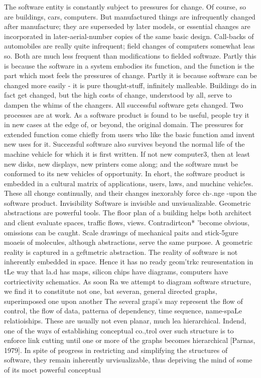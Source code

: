 \documentclass[12pt]{article}
\begin{document}
The software entity is constantly subject to pressures for change. Of course, so
are buildings, cars, computers. But manufactured things are infrequently changed after
manufacture; they are superseded by later models, or essential changes are incorporated
in later-aerial-number copies of the same basic design. Call-backs of automobiles are really
quite infrequent; field changes of computers somewhat leas so. Both are much less frequent
than modifications to fielded softwaze.
Partly this is because the software in a system embodies its function, and the function
is the part which most feels the pressures of change. Partly it is because software can be
changed more easily - it is pure thought-stuff, infinitely malleable. Buildings do in fact
get changed, but the high costs of change, understood by all, serve to dampen the whims
of the changers.
All successful software gets changed. Two processes are at work. As a software product
is found to be useful, people try it in new cases at the edge of, or beyond, the original
domain. The pressures for extended function come chiefly from users who like the basic
function amd invent new uses for it.
Succezsful software also survives beyond the normal life of the machine vehicle for
which it is first written. If not new computer3, then at least new disks, new displays, new
printers come along; and the software must be conformed to its new vehicles of opportunity.
In ehort, the software product is embedded in a cultural matrix of applications, users,
laws, and muchinc vehic!es. These all chonge continually, and their changes inexorably
force ch-.nge -upon the software product.
Invisibility
Software is invisible and unvisualizable. Geometric abstractions are powerful tools.
The floor plan of a building helps both architect and client evaluate spaces, traffic flows,
views. Contradirtcon* 'become obvious, omissions can be caught. Scale drawings of
mechanical paits and stick-5gure moaeis of molecules, although abstractions, serve the
same purpose. A geometric reality is captured in a geftmetric abstraction.
The reality of software is not inherently embedded in space. Hence it has no ready
geom'trkc reuresentation in tLe way that la.d has maps, silicon chips have diagrams, computers have cortriectivity schematics. As soon Ra we attempt to diagram software structure,
we find it to constitute not one, bat severan, general directed graphs, superimposed one
upon another The several grapi's may represent the flow of control, the flow of data,
patterna of dependency, time sequence, name-spaLe relatioiships. These are usually not
even planar, much lea hierarchical. Indend, one of the ways of establishing conceptual
co.,trol over such structure is to enforce link cutting until one or more of the graphs
becomes hierarchical [Parnas, 1979].
In spite of progress in restricting and simplifying the structures of software, they remain
inherently urvisualizable, thus depriving the mind of some of its moct powerful conceptual
\end{document}
